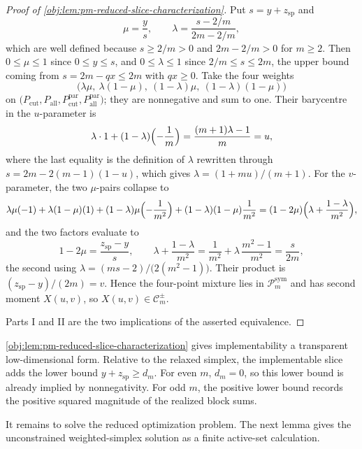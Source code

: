 \documentclass[11pt]{article}
\begin{document}
\begin{proof}[Proof of \cref{obj:lem:pm-reduced-slice-characterization}]
Put \(s=y+z_{\mathrm{sp}}\) and
\[
\mu=\frac{y}{s},
\qquad
\lambda=\frac{s-2/m}{2m-2/m},
\]
which are well defined because \(s\ge2/m>0\) and \(2m-2/m>0\) for \(m\ge2\).  Then \(0\le\mu\le1\) since \(0\le y\le s\), and \(0\le\lambda\le1\) since \(2/m\le s\le 2m\), the upper bound coming from \(s=2m-qx\le2m\) with \(qx\ge0\).  Take the four weights
\[
\bigl(\lambda\mu,\ \lambda(1-\mu),\ (1-\lambda)\mu,\ (1-\lambda)(1-\mu)\bigr)
\]
on \(\bigl(P_{\mathrm{cut}},P_{\mathrm{all}},P^{\mathrm{par}}_{\mathrm{cut}},P^{\mathrm{par}}_{\mathrm{all}}\bigr)\); they are nonnegative and sum to one.  Their barycentre in the \(u\)-parameter is
\[
\lambda\cdot1+(1-\lambda)\Bigl(-\frac1m\Bigr)
=\frac{(m+1)\lambda-1}{m}
=u,
\]
where the last equality is the definition of \(\lambda\) rewritten through \(s=2m-2(m-1)(1-u)\), which gives \(\lambda=(1+mu)/(m+1)\).  For the \(v\)-parameter, the two \(\mu\)-pairs collapse to
\[
\lambda\mu(-1)+\lambda(1-\mu)(1)
+(1-\lambda)\mu\Bigl(-\frac1{m^2}\Bigr)+(1-\lambda)(1-\mu)\frac1{m^2}
=(1-2\mu)\Bigl(\lambda+\frac{1-\lambda}{m^2}\Bigr),
\]
and the two factors evaluate to
\[
1-2\mu=\frac{z_{\mathrm{sp}}-y}{s},
\qquad
\lambda+\frac{1-\lambda}{m^2}
=\frac{1}{m^2}+\lambda\,\frac{m^2-1}{m^2}
=\frac{s}{2m},
\]
the second using \(\lambda=(ms-2)/\bigl(2(m^2-1)\bigr)\).  Their product is \((z_{\mathrm{sp}}-y)/(2m)=v\).  Hence the four-point mixture lies in \(\mathcal P_m^{\mathrm{sym}}\) and has second moment \(X(u,v)\), so \(X(u,v)\in\mathcal C_m^{\pm}\). %


Parts I and II are the two implications of the asserted equivalence. %
\end{proof}

\cref{obj:lem:pm-reduced-slice-characterization} gives implementability a transparent low-dimensional form. Relative to the relaxed simplex, the implementable slice adds the lower bound \(y+z_{\mathrm{sp}}\ge d_m\). For even \(m\), \(d_m=0\), so this lower bound is already implied by nonnegativity. For odd \(m\), the positive lower bound records the positive squared magnitude of the realized block sums.

It remains to solve the reduced optimization problem. The next lemma gives the unconstrained weighted-simplex solution as a finite active-set calculation.
\end{document}
